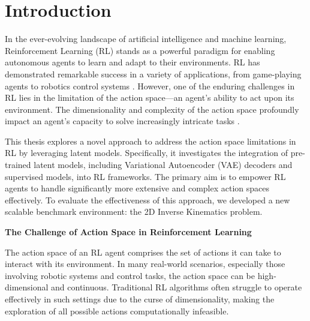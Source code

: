 \chapter{Introduction}\label{chap:introduction}




In the ever-evolving landscape of artificial intelligence and machine learning, Reinforcement Learning (RL) stands as a powerful paradigm for enabling autonomous agents to learn and adapt to their environments. RL has demonstrated remarkable success in a variety of applications, from game-playing agents \cite{SAC_VideoGames_Paper} to robotics control systems \cite{SAC_Applications_Paper} \cite{anymal_RL}. However, one of the enduring challenges in RL lies in the limitation of the action space—an agent's ability to act upon its environment. The dimensionality and complexity of the action space profoundly impact an agent's capacity to solve increasingly intricate tasks \cite{RL_Complex_Action_Spaces}.

This thesis explores a novel approach to address the action space limitations in RL by leveraging latent models. Specifically, it investigates the integration of pre-trained latent models, including Variational Autoencoder (VAE) decoders and supervised models, into RL frameworks. The primary aim is to empower RL agents to handle significantly more extensive and complex action spaces effectively. To evaluate the effectiveness of this approach, we developed a new scalable benchmark environment: the 2D Inverse Kinematics problem.

\textbf{The Challenge of Action Space in Reinforcement Learning}

The action space of an RL agent comprises the set of actions it can take to interact with its environment. In many real-world scenarios, especially those involving robotic systems and control tasks, the action space can be high-dimensional and continuous. Traditional RL algorithms often struggle to operate effectively in such settings due to the curse of dimensionality, making the exploration of all possible actions computationally infeasible.

